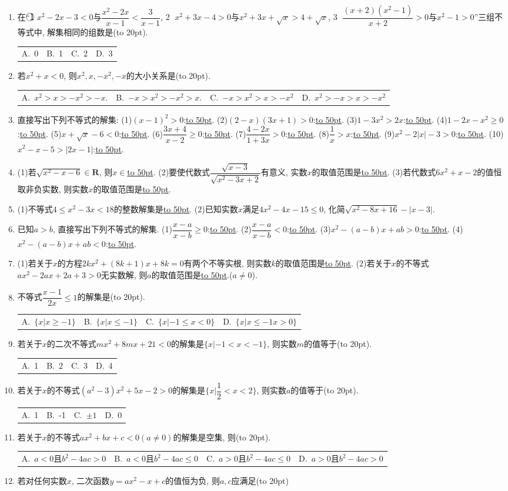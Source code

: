 \documentclass[10pt,a4paper]{article}
\newcommand{\blank}[1]{\underline{\hbox to #1pt{}}}
\newcommand{\bracket}[1]{(\hbox to #1pt{})}
\newcommand{\fourch}[4]{\par\begin{tabular}{p{.23\textwidth}p{.23\textwidth}p{.23\textwidth}p{.23\textwidth}}
A.~#1 &B.~#2& C.~#3& D.~#4
\end{tabular}}
\begin{document}
\begin{enumerate}[1.]
    \item 在``\textcircled{1} $x^2-2x-3<0$与$\dfrac{{x^2}-2x}{x-1}<\dfrac 3{x-1}$, \textcircled{2} $x^2+3x-4>0$与${x^2}+3x+\sqrt x>4+\sqrt x$, \textcircled{3} $\dfrac{(x+2)({x^2}-1)}{x+2}>0$与$x^2-1>0$''三组不等式中, 解集相同的组数是\bracket{20}.
    \fourch{0}{1}{2}{3}
    \item 若$x^2+x<0$, 则$x^2,x,-x^2,-x$的大小关系是\bracket{20}.
    \fourch{$x^2>x>-x^2>-x.$}{$-x>x^2>-x^2>x.$}{$-x>x^2>x>-x^2$}{$x^2>-x>x>-x^2$}
    \item 直接写出下列不等式的解集:
    (1)$(x-1)^2>0$:\blank{50}.		(2)$(2-x)(3x+1)>0$:\blank{50}.
    (3)$1-3x^2>2x$:\blank{50}.		(4)$1-2x-x^2\ge 0$:\blank{50}.
    (5)$x+\sqrt x-6<0$:\blank{50}.	(6)$\dfrac{3x+4}{x-2}\ge 0$:\blank{50}.
    (7)$\dfrac{4-2x}{1+3x}>0$:\blank{50}.		(8)$\dfrac 1x>x$:\blank{50}.	
    (9)$x^2-2|x|-3>0$:\blank{50}.	(10)$x^2-x-5>|2x-1|$:\blank{50}.
    \item (1)若$\sqrt{{x^2}-x-6}\in \mathbf{R}$, 则$x\in$\blank{50}.	
    (2)要使代数式$\dfrac{\sqrt{x-3}}{\sqrt{{x^2}-3x+2}}$有意义, 实数$x$的取值范围是\blank{50}.
    (3)若代数式$6x^2+x-2$的值恒取非负实数, 则实数$x$的取值范围是\blank{50}.
    \item (1)不等式$4\le x^2-3x<18$的整数解集是\blank{50}.
    (2)已知实数$x$满足$4x^2-4x-15\le 0$, 化简$\sqrt{{x^2}-8x+16}-|x-3|$.
    \item 已知$a>b$, 直接写出下列不等式的解集.
    (1)$\dfrac{x-a}{x-b}\ge 0$:\blank{50}.
    (2)$\dfrac{x-a}{x-b}<0$:\blank{50}.
    (3)$x^2-(a-b)x+ab>0$:\blank{50}.	
    (4)$x^2-(a-b)x+ab<0$:\blank{50}.	
    \item (1)若关于$x$的方程$2kx^2+(8k+1)x+8k=0$有两个不等实根, 则实数$k$的取值范围是\blank{50}.	
    (2)若关于$x$的不等式$ax^2-2ax+2a+3>0$无实数解, 则$a$的取值范围是\blank{50}.($a\ne 0$).
    \item 不等式$\dfrac{x-1}{2x}\le 1$的解集是\bracket{20}.
    \fourch{$\{x|x\ge -1\}$	}{$\{x|x\le -1\}$}{$\{x|-1\le x<0\}$}{$\{x|x\le -1x>0\}$}
    \item 若关于$x$的二次不等式$mx^2+8mx+21<0$的解集是$\{x|-1<x<-1\}$, 则实数$m$的值等于\bracket{20}.
    \fourch{1}{2}{3}{4}
    \item 若关于$x$的不等式$(a^2-3)x^2+5x-2>0$的解集是$\{x|\dfrac 12<x<2\}$, 则实数$a$的值等于\bracket{20}.
    \fourch{1}{-1}{$\pm 1$}{0}
    \item 若关于$x$的不等式$ax^2+bx+c<0(a\ne 0)$的解集是空集, 则\bracket{20}.
    \fourch{$a<0$且$b^2-4ac>0$}{$a<0$且$b^2-4ac\le 0$}{$a>0$且$b^2-4ac\le 0$}{$a>0$且$b^2-4ac>0$}
    \item 若对任何实数$x$, 二次函数$y=ax^2-x+c$的值恒为负, 则$a,c$应满足\bracket{20}

\end{enumerate}
\end{document}
